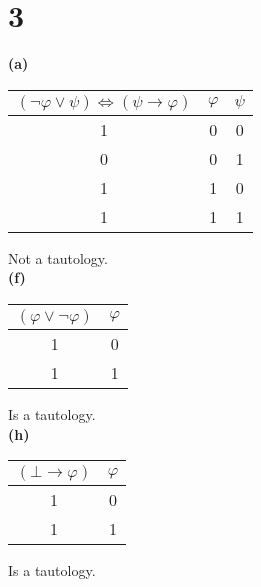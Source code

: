 \documentclass[10pt]{article}
\begin{document}

\section*{3}

\textbf{(a)}

\begin{tabular}{ c || c | c }			
  $(\lnot \varphi \lor \psi) \iff (\psi \to \varphi)$ & $\varphi$ & $\psi$ \\
  \hline
  1 & 0 & 0 \\
  0 & 0 & 1 \\
  1 & 1 & 0 \\
  1 & 1 & 1 \\
  \hline  
\end{tabular}
Not a tautology.\\


\noindent \textbf{(f)}

\begin{tabular}{ c || c }			
  $(\varphi \lor \lnot \varphi)$ & $\varphi$ \\
  \hline
  1 & 0 \\
  1 & 1 \\
  \hline  
\end{tabular}
Is a tautology.\\

\noindent \textbf{(h)}

\begin{tabular}{ c || c }			
  $(\bot \to \varphi)$ & $\varphi$ \\
  \hline
  1 & 0 \\
  1 & 1 \\
  \hline  
\end{tabular}
Is a tautology.

\end{document}

